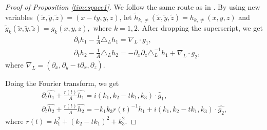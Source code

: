 \documentclass[12pt, reqno]{amsart}
\numberwithin{equation}{section}
\begin{document}
	
	
	
	\begin{proof}[Proof of Proposition \ref{timespace1}] We follow the same route as in \cite{wei2}.
		By using new variables $(\tilde{x},\tilde{y},\tilde{z})=(x-ty,y,z)$,  let $\tilde{h}_{k,\neq}(\tilde{x},\tilde{y},\tilde{z})
		=h_{k,\neq}(x,y,z)$
		and $\tilde{g}_k(\tilde{x},\tilde{y},\tilde{z})=g_k(x,y,z),$ where $k=1,2$.
		After dropping the superscript, we get
		\begin{align*}
			&\partial_th_1-\frac{1}{A}\triangle_{L} 
			h_1=\nabla_{L}\cdot g_1,\\
			&\partial_th_2-\frac{1}{A}\triangle_{L} 
			h_2=-\partial_x\partial_z\triangle_{L}^{-1}h_1+\nabla_{L}\cdot g_2,
		\end{align*}
		where $\nabla_{L}=(\partial_x,\partial_y-t\partial_x,\partial_z).$
		
		Doing the Fourier transform, we get 
		\begin{equation}\label{f_time_1}
			\begin{array}{lr}
				\partial_t\widehat{h_1}+\frac{r(t)}{A}\widehat{h_1}=
				i(k_1,k_2-tk_1,k_3)\cdot \widehat{g}_1,\\
				\partial_t\widehat{h_2}+\frac{r(t)}{A}
				\widehat{h_2}=-k_1k_3r(t)^{-1}\widehat{h_1}
				+i(k_1,k_2-tk_1,k_3)\cdot \widehat{g_2},
			\end{array}
		\end{equation}
		where $r(t)={k_1^2}+\left(k_2-tk_1\right)^2+{k_3^2}.$
		

\end{proof}
\end{document}

